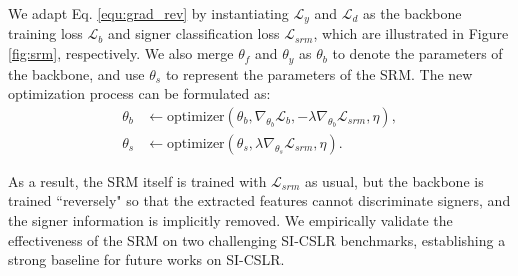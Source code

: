 \documentclass[acmsmall,screen]{acmart}
\begin{document}
We adapt Eq. \ref{equ:grad_rev} by instantiating $\mathcal{L}_y$ and $\mathcal{L}_d$ as the backbone training loss $\mathcal{L}_b$ and signer classification loss $\mathcal{L}_{srm}$, which are illustrated in Figure 
\ref{fig:srm}, respectively. We also merge $\theta_f$ and $\theta_y$ as $\theta_b$ to denote the parameters of the backbone, and use $\theta_s$ to represent the parameters of the SRM. The new optimization process can be formulated as:
\begin{equation}
\begin{split}
\theta_b &\leftarrow \text{optimizer}(\theta_b, \nabla_{\theta_b}\mathcal{L}_b, -\lambda \nabla_{\theta_b}\mathcal{L}_{srm}, \eta), \\
\theta_s &\leftarrow \text{optimizer}(\theta_s, \lambda \nabla_{\theta_s}\mathcal{L}_{srm}, \eta).
\end{split}
\end{equation}

As a result, the SRM itself is trained with $\mathcal{L}_{srm}$ as usual, but the backbone is trained ``reversely" so that the extracted features cannot discriminate signers, and the signer information is implicitly removed.
We empirically validate the effectiveness of the SRM on two challenging SI-CSLR benchmarks, establishing a strong baseline for future works on SI-CSLR.
\end{document}
